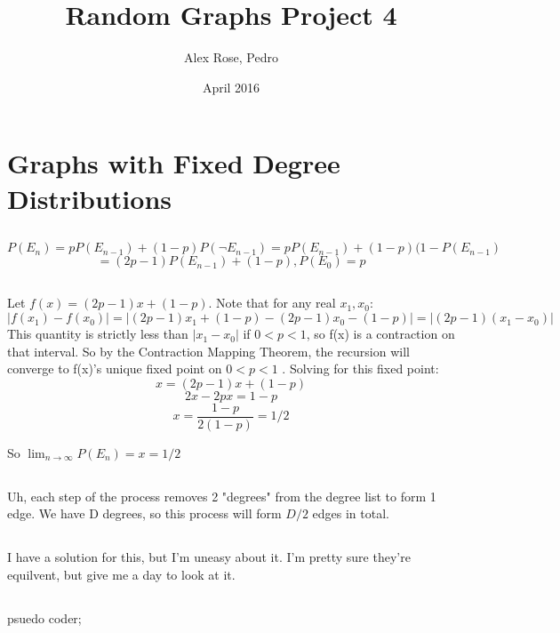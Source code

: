 \documentclass{article}
\title{Random Graphs Project 4}
\author{Alex Rose, Pedro}
\date{April 2016}
\begin{document}
\maketitle

\section{ Graphs with Fixed Degree Distributions}

\subsection{ }

$$P(E_n) = pP(E_{n-1}) + (1-p)P(\neg E_{n-1}) = pP(E_{n-1}) + (1-p)(1- P(E_{n-1}) $$
$$ = (2p-1)P(E_{n-1}) + (1 - p), P(E_0) = p$$

\subsection{} 
Let $f(x) = (2p -1)x + (1-p)$. Note that for any real $x_1,x_0$:
$$|f(x_1) - f(x_0)| = |(2p-1)x_1 + (1-p) - (2p-1)x_0 - (1-p)| = |(2p-1)(x_1-x_0)|$$
This quantity is strictly less than $|x_1-x_0|$ if $0 < p < 1$, so f(x) is a contraction on that interval. So by the Contraction Mapping Theorem, the recursion will converge to f(x)'s unique fixed point on $0 < p < 1$ .   Solving for this fixed point:
$$x = (2p-1)x + (1-p)$$
$$2x - 2px = 1-p$$
$$x = \frac{1-p}{2(1-p)} = 1/2$$

So $\lim_{n\to\infty} P(E_{n})= x = 1/2$

\subsection{}
Uh, each step of the process removes 2 "degrees" from the degree list to form 1 edge. We have D degrees, so this process will form $D/2$ edges in total.

\subsection{}
I have a solution for this, but I'm uneasy about it. I'm pretty sure they're equilvent, but give me a day to look at it.

\subsection{} 

\begin{algorithm}[H]
psuedo coder;
\end{algorithm}
\end{document}
